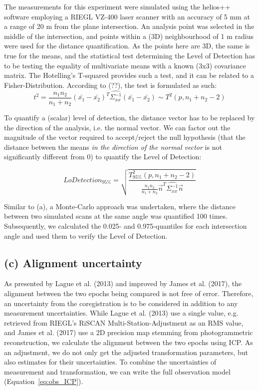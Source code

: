 \documentclass[preprint,12pt,3p]{elsarticle}
\begin{document}
The measurements for this experiment were simulated using the helios++ software employing a RIEGL VZ-400 laser scanner with an accuracy of 5 mm at a range of 20 m from the plane intersection. An analysis point was selected in the middle of the intersection, and points within a (3D) neighbourhood of 1 m radius were used for the distance quantification.
As the points here are 3D, the same is true for the means, and the statistical test determining the Level of Detection has to be testing the equality of multivariate means with a known (3x3) covariance matrix. The Hotelling’s T-squared provides such a test, and it can be related to a Fisher-Distribution. According to (??), the test is formulated as such:
\begin{equation}
    t^2 = \frac{n_1 n_2}{n_1 + n_2} \left(\bar{x_1} - \bar{x_2}\right)^T \hat{\Sigma_{xx}^{-1}} \left(\bar{x_1} - \bar{x_2}\right) \sim T^2(p, n_1+n_2-2)
\end{equation}

To quantify a (scalar) level of detection, the distance vector has to be replaced by the direction of the analysis, i.e. the normal vector. We can factor out the magnitude of the vector required to accept/reject the null hypothesis (that the distance between the means \emph{in the direction of the normal vector} is not significantly different from 0) to quantify the Level of Detection:

\begin{equation}
    LoDetection_{95\%} = \sqrt{\frac{T^2_{95\%}(p, n_1+n_2-2)}{\frac{n_1 n_2}{n_1 + n_2} \vec{n}^T \hat{\Sigma_{xx}^{-1}} \vec{n}}}
\end{equation}

Similar to (a), a Monte-Carlo approach was undertaken, where the distance between two simulated scans at the same angle was quantified 100 times. Subsequently, we calculated the 0.025- and 0.975-quantiles for each intersection angle and used them to verify the Level of Detection.


\subsection{(c) Alignment uncertainty}
As presented by Lague et al. (2013) and improved by James et al. (2017), the alignment between the two epochs being compared is not free of error. Therefore, an uncertainty from the coregistration is to be considered in addition to any measurement uncertainties. While Lague et al. (2013) use a single value, e.g. retrieved from RIEGL’s RiSCAN Multi-Station-Adjustment as an RMS value, and James et al. (2017) use a 2D precision map stemming from photogrammetric reconstruction, we calculate the alignment between the two epochs using ICP. As an adjustment, we do not only get the adjusted transformation parameters, but also estimates for their uncertainties. 
To combine the uncertainties of measurement and transformation, we can write the full observation model (Equation~\ref{eq:obs_ICP}).
\end{document}
